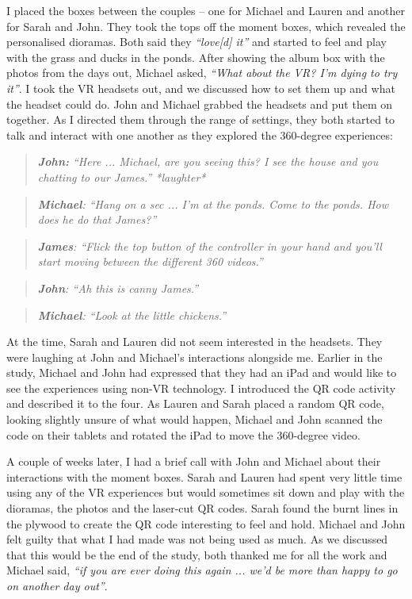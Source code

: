 I placed the boxes between the couples – one for Michael and Lauren and another for Sarah and John. They took the tops off the moment boxes, which revealed the personalised dioramas. Both said they \textit{``love[d] it''} and started to feel and play with the grass and ducks in the ponds. After showing the album box with the photos from the days out, Michael asked, \textit{``What about the VR? I'm dying to try it''}. I took the VR headsets out, and we discussed how to set them up and what the headset could do. John and Michael grabbed the headsets and put them on together. As I directed them through the range of settings, they both started to talk and interact with one another as they explored the 360-degree experiences:

\begin{quote}
\textit{    \textbf{John:} ``Here ... Michael, are you seeing this? I see the house and you chatting to our James.'' *laughter*
}
\end{quote}
\begin{quote}
\textit{    \textbf{Michael}: ``Hang on a sec ... I'm at the ponds. Come to the ponds. How does he do that James?''
}
\end{quote}
\begin{quote}
\textit{    \textbf{James}: ``Flick the top button of the controller in your hand and you'll start moving between the different 360 videos.''
}
\end{quote}
\begin{quote}
\textit{   \textbf{ John}: ``Ah this is canny James.''
}
\end{quote}
\begin{quote}
\textit{    \textbf{Michael}: ``Look at the little chickens.''}
\end{quote}
At the time, Sarah and Lauren did not seem interested in the headsets. They were laughing at John and Michael's interactions alongside me. Earlier in the study, Michael and John had expressed that they had an iPad and would like to see the experiences using non-VR technology. I introduced the QR code activity and described it to the four. As Lauren and Sarah placed a random QR code, looking slightly unsure of what would happen, Michael and John scanned the code on their tablets and rotated the iPad to move the 360-degree video.

A couple of weeks later, I had a brief call with John and Michael about their interactions with the moment boxes. Sarah and Lauren had spent very little time using any of the VR experiences but would sometimes sit down and play with the dioramas, the photos and the laser-cut QR codes. Sarah found the burnt lines in the plywood to create the QR code interesting to feel and hold. Michael and John felt guilty that what I had made was not being used as much. As we discussed that this would be the end of the study, both thanked me for all the work and Michael said, \textit{``if you are ever doing this again ... we'd be more than happy to go on another day out''}.

